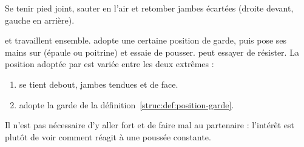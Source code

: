 \begin{exercice}

Se tenir pied joint, sauter en l'air et retomber jambes écartées (droite devant, gauche en arrière).


\end{exercice}


\begin{exercice}
\label{struc:ex:test-position}


\A et \D travaillent ensemble.
\D adopte une certaine position de garde, puis \A pose ses mains sur \D (épaule ou poitrine) et essaie de pousser.
\D peut essayer de résister.
La position adoptée par \D est variée entre les deux extrêmes :
\begin{enumerate}
	\item \D se tient debout, jambes tendues et de face.
	\item \D adopte la garde de la définition~\ref{struc:def:position-garde}.
\end{enumerate}

Il n'est pas nécessaire d'y aller fort et de faire mal au partenaire : l'intérêt est plutôt de voir comment \D réagit à une poussée constante.

\end{exercice}


